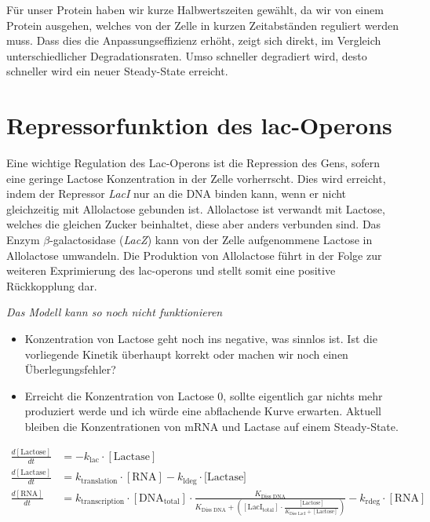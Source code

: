 \documentclass{article}
\begin{document}
Für unser Protein haben wir kurze Halbwertszeiten gewählt, da wir von einem Protein ausgehen, welches von der Zelle in kurzen Zeitabständen reguliert werden muss. Dass dies die Anpassungseffizienz erhöht, zeigt sich direkt, im Vergleich unterschiedlicher Degradationsraten. Umso schneller degradiert wird, desto schneller wird ein neuer Steady-State erreicht.

\section*{Repressorfunktion des lac-Operons}

Eine wichtige Regulation des Lac-Operons ist die Repression des Gens, sofern eine geringe Lactose Konzentration in der Zelle vorherrscht. Dies wird erreicht, indem der Repressor \emph{LacI} nur an die DNA binden kann, wenn er nicht gleichzeitig mit Allolactose gebunden ist. Allolactose ist verwandt mit Lactose, welches die gleichen Zucker beinhaltet, diese aber anders verbunden sind. Das Enzym $\beta$-galactosidase (\emph{LacZ}) kann von der Zelle aufgenommene Lactose in Allolactose umwandeln. Die Produktion von Allolactose führt in der Folge zur weiteren Exprimierung des lac-operons und stellt somit eine positive Rückkopplung dar.
\par

\emph{Das Modell kann so noch nicht funktionieren}
\begin{itemize}
    \item Konzentration von Lactose geht noch ins negative, was sinnlos ist. Ist die vorliegende Kinetik überhaupt korrekt oder machen wir noch einen Überlegungsfehler?
    \item Erreicht die Konzentration von Lactose 0, sollte eigentlich gar nichts mehr produziert werde und ich würde eine abflachende Kurve erwarten. Aktuell bleiben die Konzentrationen von mRNA und Lactase auf einem Steady-State.
\end{itemize}

\begin{align*}
    \frac{d[\text{Lactose}]}{dt}&=-k_\text{lac}\cdot [\text{Lactase}] \\
    \frac{d[\text{Lactase}]}{dt}&=k_\text{translation}\cdot[\text{RNA}]-k_\text{ldeg}\cdot [\text{Lactase]}\\
    \frac{d[\text{RNA}]}{dt}&=k_\text{transcription}\cdot[\text{DNA}_\text{total}]\cdot\frac{K_\text{Diss DNA}}{K_\text{Diss DNA}+([\text{LacI}_\text{total}]\cdot\frac{[\text{Lactose}]}{K_\text{Diss LacI}+[\text{Lactose}]})}-k_\text{rdeg}\cdot[\text{RNA}]
\end{align*}



\printbibliography[title=References]
\end{document}
